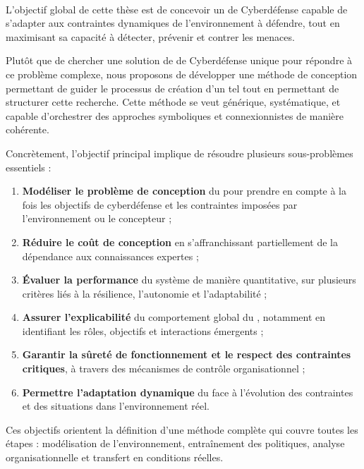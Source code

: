 \\

L'objectif global de cette thèse est de concevoir un  de Cyberdéfense capable de s'adapter aux contraintes dynamiques de l'environnement à défendre, tout en maximisant sa capacité à détecter, prévenir et contrer les menaces.

Plutôt que de chercher une solution de  de Cyberdéfense unique pour répondre à ce problème complexe, nous proposons de développer une méthode de conception permettant de guider le processus de création d'un tel  tout en permettant de structurer cette recherche. Cette méthode se veut générique, systématique, et capable d'orchestrer des approches symboliques et connexionnistes de manière cohérente.

Concrètement, l'objectif principal implique de résoudre plusieurs sous-problèmes essentiels :
\begin{enumerate}
    \item \textbf{Modéliser le problème de conception} du  pour prendre en compte à la fois les objectifs de cyberdéfense et les contraintes imposées par l'environnement ou le concepteur ;
    \item \textbf{Réduire le coût de conception} en s'affranchissant partiellement de la dépendance aux connaissances expertes ;
    \item \textbf{Évaluer la performance} du système de manière quantitative, sur plusieurs critères liés à la résilience, l'autonomie et l'adaptabilité ;
    \item \textbf{Assurer l'explicabilité} du comportement global du , notamment en identifiant les rôles, objectifs et interactions émergents ;
    \item \textbf{Garantir la sûreté de fonctionnement et le respect des contraintes critiques}, à travers des mécanismes de contrôle organisationnel ;
    \item \textbf{Permettre l'adaptation dynamique} du  face à l'évolution des contraintes et des situations dans l'environnement réel.
\end{enumerate}

Ces objectifs orientent la définition d'une méthode complète qui couvre toutes les étapes : modélisation de l'environnement, entraînement des politiques, analyse organisationnelle et transfert en conditions réelles.

\

\bigskip

